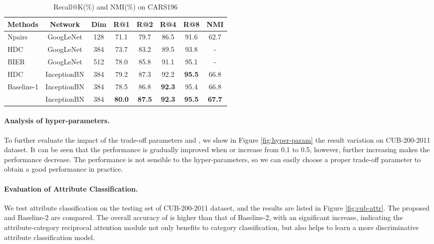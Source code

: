 \documentclass[sigconf]{acmart}
\begin{document}
\begin{table*}[!htp]
\renewcommand\arraystretch{1.0}
\centering
\caption{Recall@K(\%) and NMI(\%) on CARS196}
\label{table:car-retrieval}
\begin{tabular}{l|c|c|c|c|c|c|c}
\Xhline{1.0pt}
Methods & Network & Dim & R@1 & R@2 & R@4  & R@8 & NMI   \\ \hline
Npairs \cite{npair} & GoogLeNet & 128  & 71.1  & 79.7  & 86.5 & 91.6 & 62.7  \\
HDC \cite{hdc} & GoogLeNet & 384 & 73.7 & 83.2  & 89.5 & 93.8 & -  \\
BIER \cite{bier}  & GoogLeNet & 512 & 78.0 & 85.8 & 91.1 & 95.1 & - \\ \hline
HDC & InceptionBN  & 384 & 79.2 & 87.3 & 92.2 & \textbf{95.5} & 66.8 \\ 
Baseline-1 & InceptionBN  & 384 & 78.5 & 86.8 & \textbf{92.3} & 95.4 & 66.8 \\ 
 & InceptionBN & 384 & \textbf{80.0} &  \textbf{87.5} & \textbf{92.3} & \textbf{95.5} & \textbf{67.7}  \\ \hline
\end{tabular}
\end{table*}

\paragraph{Analysis of hyper-parameters.}
To further evaluate the impact of the trade-off parameters  and , we show in Figure \ref{fig:hyper-param} the result variation on CUB-200-2011 dataset. It can be seen that the performance is gradually improved when  or  increase from 0.1 to 0.5, however, further increasing  makes the performance decrease. The performance is not sensible to the hyper-parameters, so we can easily choose a proper trade-off parameter to obtain a good performance in practice.

\paragraph{Evaluation of Attribute Classification.}
We test attribute classification on the testing set of CUB-200-2011 dataset, and the results are listed in Figure \ref{fig:cub-attr}. The proposed  and Baseline-2 are compared. The overall accuracy of  is higher than that of Baseline-2, with an significant increase, indicating the attribute-category reciprocal attention module not only benefits to category classification, but also helps to learn a more discriminative attribute classification model.
\end{document}
